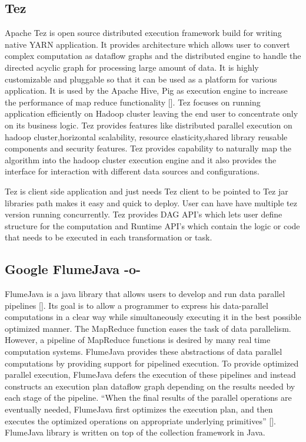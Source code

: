 \subsection{Tez}

Apache Tez is open source distributed execution framework build for
writing native YARN application. It provides architecture which allows
user to convert complex computation as dataflow graphs and the
distributed engine to handle the directed acyclic graph for processing
large amount of data. It is highly customizable and pluggable so that
it can be used as a platform for various application. It is used by
the Apache Hive, Pig as execution engine to increase the performance
of map reduce functionality [\cite{www-apache-tez}]. Tez focuses on
running application efficiently on Hadoop cluster leaving the end user
to concentrate only on its business logic. Tez provides features like
distributed parallel execution on hadoop cluster,horizontal
scalability, resource elasticity,shared library reusable components
and security features. Tez provides capability to naturally map the
algorithm into the hadoop cluster execution engine and it also
provides the interface for interaction with different data sources and
configurations.
  
Tez is client side application and just needs Tez client to be pointed
to Tez jar libraries path makes it easy and quick to deploy. User can
have have multiple tez version running concurrently. Tez provides DAG
API's which lets user define structure for the computation and Runtime
API's which contain the logic or code that needs to be executed in
each transformation or task.

\subsection{Google FlumeJava -o-}

FlumeJava is a java library that allows users to develop and run data
parallel pipelines [\cite{www-flumejava-google}]. Its goal is to allow a
programmer to express his data-parallel computations in a clear way
while simultaneously executing it in the best possible optimized
manner. The MapReduce function eases the task of data
parallelism. However, a pipeline of MapReduce functions is desired by
many real time computation systems. FlumeJava provides these
abstractions of data parallel computations by providing support for
pipelined execution. To provide optimized parallel execution,
FlumeJava defers the execution of these pipelines and instead
constructs an execution plan dataflow graph depending on the results
needed by each stage of the pipeline. ``When the final results of the
parallel operations are eventually needed, FlumeJava first optimizes
the execution plan, and then executes the optimized operations on
appropriate underlying primitives'' [\cite{flumejava-paper}]. FlumeJava
library is written on top of the collection framework in Java.

